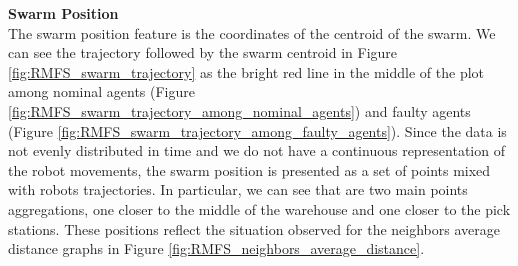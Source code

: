 \documentclass[../../Thesis.tex]{subfiles}
\begin{document}
				\textbf{Swarm Position}\\
				The swarm position feature is the coordinates of the centroid of the swarm. We can see the trajectory followed by the swarm centroid in Figure \ref{fig:RMFS_swarm_trajectory} as the bright red line in the middle of the plot among nominal agents (Figure \ref{fig:RMFS_swarm_trajectory_among_nominal_agents}) and faulty agents (Figure \ref{fig:RMFS_swarm_trajectory_among_faulty_agents}). Since the data is not evenly distributed in time and we do not have a continuous representation of the robot movements, the swarm position is presented as a set of points mixed with robots trajectories. In particular, we can see that are two main points aggregations, one closer to the middle of the warehouse and one closer to the pick stations. These positions reflect the situation observed for the neighbors average distance graphs in Figure \ref{fig:RMFS_neighbors_average_distance}.
\end{document}
